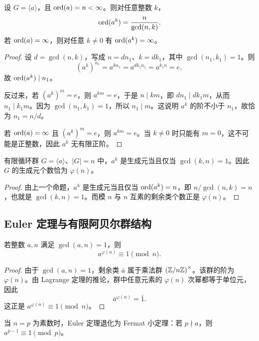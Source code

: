 \begin{proposition}[循环群中元素的阶]
设 $G=\langle a \rangle$，且 $\mathrm{ord}(a)=n<\infty$。则对任意整数 $k$，
\[
 \mathrm{ord}(a^k)=\frac{n}{\gcd(n,k)}.
\]
若 $\mathrm{ord}(a)=\infty$，则对任意 $k\ne0$ 有 $\mathrm{ord}(a^k)=\infty$。
\end{proposition}

\begin{proof}
设 $d=\gcd(n,k)$，写成 $n=dn_1$、$k=dk_1$，其中 $\gcd(n_1,k_1)=1$。则
\[
 (a^k)^{n_1}=a^{kn_1}=a^{dk_1n_1}=a^{k_1n}=e,
\]
故 $\mathrm{ord}(a^k)\mid n_1$。

反过来，若 $(a^k)^m=e$，则 $a^{km}=e$，于是 $n\mid km$，即 $dn_1\mid dk_1m$，从而 $n_1\mid k_1m$。因为 $\gcd(n_1,k_1)=1$，所以 $n_1\mid m$。这说明 $a^k$ 的阶不小于 $n_1$，故恰为 $n_1=n/d$。

若 $\mathrm{ord}(a)=\infty$ 且 $(a^k)^m=e$，则 $a^{km}=e$。当 $k\ne0$ 时只能有 $m=0$，这不可能是正整数，因此 $a^k$ 无有限正阶。
\end{proof}

\begin{corollary}
有限循环群 $G=\langle a \rangle$、$|G|=n$ 中，$a^k$ 是生成元当且仅当 $\gcd(k,n)=1$。因此 $G$ 的生成元个数恰为 $\varphi(n)$。
\end{corollary}

\begin{proof}
由上一个命题，$a^k$ 是生成元当且仅当 $\mathrm{ord}(a^k)=n$，即 $n/\gcd(n,k)=n$，也就是 $\gcd(k,n)=1$。而模 $n$ 与 $n$ 互素的剩余类个数正是 $\varphi(n)$。
\end{proof}

\subsection*{Euler 定理与有限阿贝尔群结构}

\begin{theorem}[Euler 定理]
若整数 $a,n$ 满足 $\gcd(a,n)=1$，则
\[
 a^{\varphi(n)} \equiv 1 \pmod n.
\]
\end{theorem}

\begin{proof}
由于 $\gcd(a,n)=1$，剩余类 $\bar a$ 属于乘法群 $\left(\mathbb{Z}/n\mathbb{Z}\right)^\times$。该群的阶为 $\varphi(n)$。由 Lagrange 定理的推论，群中任意元素的 $\varphi(n)$ 次幂都等于单位元，因此
\[
 \bar a^{\varphi(n)}=\bar 1.
\]
这正是 $a^{\varphi(n)} \equiv 1 \pmod n$。
\end{proof}

\begin{remark}
当 $n=p$ 为素数时，Euler 定理退化为 Fermat 小定理：若 $p\nmid a$，则 $a^{p-1}\equiv1 \pmod p$。
\end{remark}

